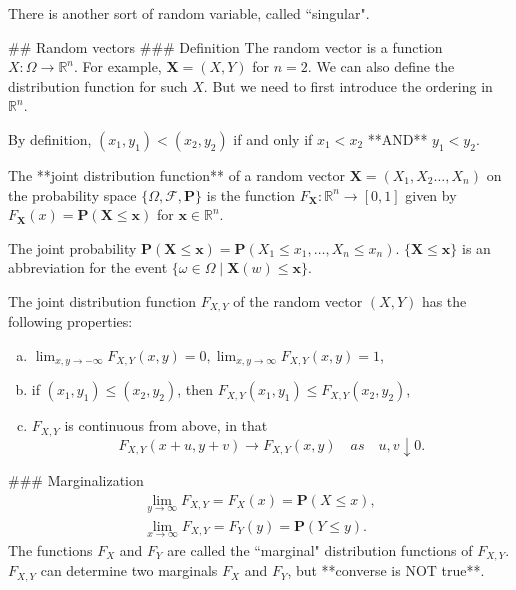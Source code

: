 There is another sort of random variable, called ``singular".


## Random vectors
### Definition
The random vector is a function $X : \Omega \to \mathbb{R}^n$. For example, $\mathbf{X} = (X, Y)$ for $n=2$. We can also define the distribution function for such $X$. But we need to first introduce the ordering in $\mathbb{R}^n$.
\begin{center}
    By definition, $(x_1, y_1) < (x_2, y_2)$ if and only if $x_1 < x_2$  **AND**  $y_1 < y_2$.
\end{center}

\begin{definition}
The **joint distribution function** of a random vector $\mathbf{X} = (X_1, X_2 \dots, X_n)$ on the probability space $\{ \Omega, \mathcal{F}, \mathbf{P} \}$ is the function $F_{\mathbf{X}} : \mathbb{R}^n \to [0, 1]$ given by $F_{\mathbf{X}}(x) = \mathbf{P}(\mathbf{X} \leq \mathbf{x})$ for $\mathbf{x} \in \mathbb{R}^n$. 
\end{definition}

\begin{remark}
The joint probability $\mathbf{P}(\mathbf{X} \leq \mathbf{x}) = \mathbf{P}(X_1 \leq x_1, \dots, X_n \leq x_n)$. $\{\mathbf{X} \leq \mathbf{x} \}$ is an abbreviation for the event $\{\omega \in \Omega \;\vert\; \mathbf{X}(w) \leq \mathbf{x}\}$.
\end{remark}

\begin{lemma}
The joint distribution function $F_{X, Y}$ of the random vector $(X, Y)$ has the following properties: 
\begin{enumerate}[(a)]
    \item $\lim_{x, y\to -\infty} F_{X, Y}(x, y) = 0, \lim_{x,y\to\infty} F_{X, Y}(x,y) = 1$,
    \item if $(x_1, y_1) \leq (x_2, y_2)$, then $F_{X,Y}(x_1, y_1) \leq F_{X, Y}(x_2, y_2)$,
    \item $F_{X,Y}$ is continuous from above, in that 
    \begin{equation*}
        F_{X,Y}(x+u, y+v) \to F_{X,Y}(x,y) \quad as \quad u, v \downarrow 0.
    \end{equation*}
\end{enumerate}
\end{lemma}

### Marginalization 
\begin{gather*}
    \lim_{y\to\infty} F_{X,Y} = F_X(x) = \mathbf{P}(X \leq x), \\
    \lim_{x\to\infty} F_{X,Y} = F_Y(y) = \mathbf{P}(Y \leq y).
\end{gather*}
The functions $F_X$ and $F_Y$ are called the ``marginal" distribution functions of $F_{X,Y}$. $F_{X,Y}$ can determine two marginals $F_X$ and $F_Y$, but **converse is NOT true**.

